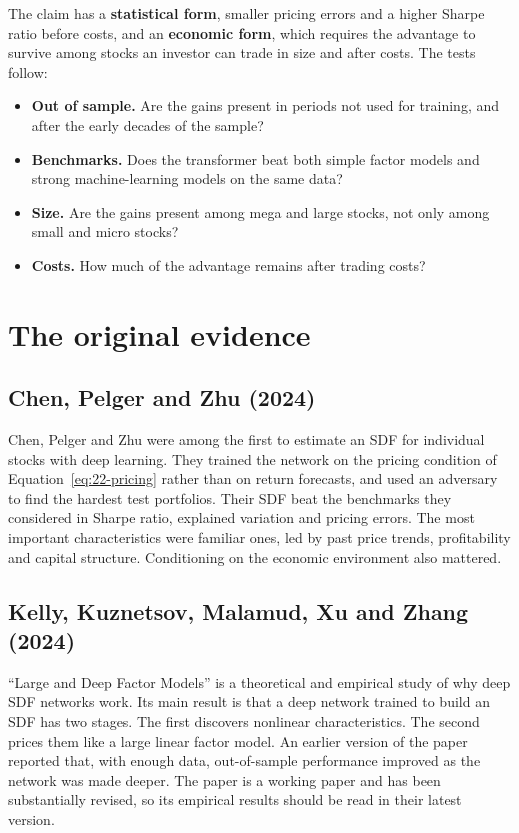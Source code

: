 The claim has a \textbf{statistical form}, smaller pricing errors and a higher Sharpe ratio before costs, and an \textbf{economic form}, which requires the advantage to survive among stocks an investor can trade in size and after costs. The tests follow:

\begin{itemize}
  \item \textbf{Out of sample.} Are the gains present in periods not used for training, and after the early decades of the sample?
  \item \textbf{Benchmarks.} Does the transformer beat both simple factor models and strong machine-learning models on the same data?
  \item \textbf{Size.} Are the gains present among mega and large stocks, not only among small and micro stocks?
  \item \textbf{Costs.} How much of the advantage remains after trading costs?
\end{itemize}

\section{The original evidence}
\label{sec:22-evidence}

\subsection{Chen, Pelger and Zhu (2024)}

Chen, Pelger and Zhu were among the first to estimate an SDF for individual stocks with deep learning. They trained the network on the pricing condition of Equation~\eqref{eq:22-pricing} rather than on return forecasts, and used an adversary to find the hardest test portfolios. Their SDF beat the benchmarks they considered in Sharpe ratio, explained variation and pricing errors. The most important characteristics were familiar ones, led by past price trends, profitability and capital structure. Conditioning on the economic environment also mattered.

\subsection{Kelly, Kuznetsov, Malamud, Xu and Zhang (2024)}

``Large and Deep Factor Models'' is a theoretical and empirical study of why deep SDF networks work. Its main result is that a deep network trained to build an SDF has two stages. The first discovers nonlinear characteristics. The second prices them like a large linear factor model. An earlier version of the paper reported that, with enough data, out-of-sample performance improved as the network was made deeper. The paper is a working paper and has been substantially revised, so its empirical results should be read in their latest version.

